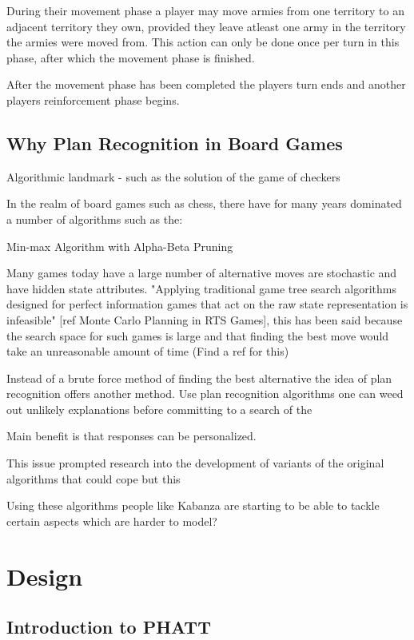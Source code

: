 \documentclass[parskip]{cs4rep}
\begin{document}
During their movement phase a player may move armies from one territory to an adjacent territory they own, provided they leave atleast one army in the territory the armies were moved from. This action can only be done once per turn in this phase, after which the movement phase is finished.

After the movement phase has been completed the players turn ends and another players reinforcement phase begins.
\newpage

\section{Why Plan Recognition in Board Games}

Algorithmic landmark - such as the solution of the game of checkers 

In the realm of board games such as chess, there have for many years dominated a number of algorithms such as the:

Min-max Algorithm with Alpha-Beta Pruning

Many games today have a large number of alternative moves are stochastic and have hidden state attributes. "Applying traditional game tree search algorithms designed for perfect information games that act on the raw state representation is infeasible" [ref Monte Carlo Planning in RTS Games], this has been said because the search space for such games is large and that finding the best move would take an unreasonable amount of time (Find a ref for this)

Instead of a brute force method of finding the best alternative the idea of plan recognition offers another method. Use plan recognition algorithms one can weed out unlikely explanations before committing to a search of the 

Main benefit is that responses can be personalized.

This issue prompted research into the development of variants of the original algorithms that could cope but this 

Using these algorithms people like Kabanza are starting to be able to tackle certain aspects which are harder to model?

\chapter{Design}

\section{Introduction to PHATT}
\end{document}
